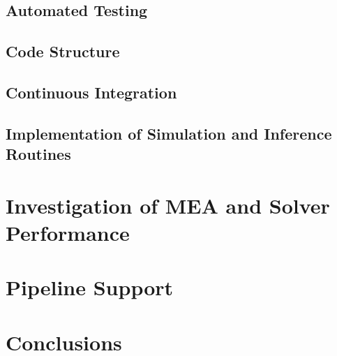 \subsection{Automated Testing}

\subsection{Code Structure}
\subsection{Continuous Integration}
\subsection{Implementation of Simulation and Inference Routines}
\section{Investigation of MEA and Solver Performance}
\section{Pipeline Support}
\section{Conclusions}

